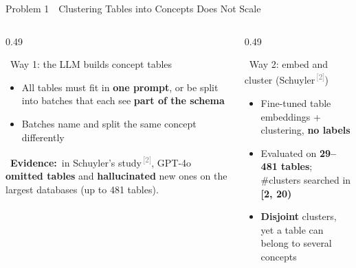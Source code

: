 \documentclass[aspectratio=169]{beamer}
\newcommand{\hred}[1]{\textcolor{tug}{\textbf{#1}}}
\newcommand{\rf}[1]{\textsuperscript{\textcolor{gray}{\,[#1]}}}
\newcommand{\apptitle}[3]{\textcolor{#1}{#2}~\textcolor{black!30}{\textbar}~#3}
\newcommand{\evidence}[1]{{\scriptsize\textcolor{tugb}{\faSearch~\textbf{Evidence:}}~#1}}
\begin{document}
\begin{frame}{\apptitle{tug}{Problem 1}{Clustering Tables into Concepts Does Not Scale}}
\scriptsize
\vspace{1mm}
\begin{columns}[T]
\begin{column}{0.49\textwidth}
\begin{block}{\faRobot~Way 1: the LLM builds concept tables}
\vspace{0.5mm}
\begin{itemize}\setlength\itemsep{1pt}
  \item All tables must fit in \textbf{one prompt}, or be split into batches that each see \textbf{part of the schema}
  \item Batches name and split the same concept differently
\end{itemize}
\vspace{1mm}
\evidence{in Schuyler's study\rf{2}, GPT-4o \hred{omitted tables} and \hred{hallucinated} new ones on the largest databases (up to 481 tables).}
\vspace{0.5mm}
\end{block}
\end{column}
\begin{column}{0.49\textwidth}
\begin{block}{\faProjectDiagram~Way 2: embed and cluster (Schuyler\rf{2})}
\vspace{0.5mm}
\begin{itemize}\setlength\itemsep{1pt}
  \item Fine-tuned table embeddings + clustering, \textbf{no labels}
  \item Evaluated on \textbf{29--481 tables}; \#clusters searched in \textbf{[2, 20)}
  \item \textbf{Disjoint} clusters, yet a table can belong to several concepts
\end{itemize}
\vspace{0.5mm}
\end{block}
\end{column}
\end{columns}


\end{frame}
\end{document}

